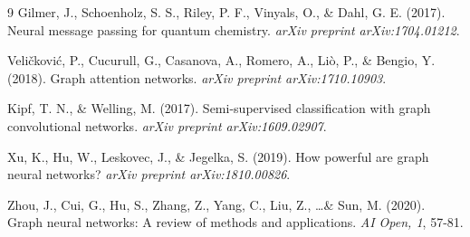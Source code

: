 \documentclass[12pt,a4paper]{article}
\begin{document}
\begin{thebibliography}{9}
Gilmer, J., Schoenholz, S. S., Riley, P. F., Vinyals, O., \& Dahl, G. E. (2017). Neural message passing for quantum chemistry. \textit{arXiv preprint arXiv:1704.01212}.

Veličković, P., Cucurull, G., Casanova, A., Romero, A., Liò, P., \& Bengio, Y. (2018). Graph attention networks. \textit{arXiv preprint arXiv:1710.10903}.

Kipf, T. N., \& Welling, M. (2017). Semi-supervised classification with graph convolutional networks. \textit{arXiv preprint arXiv:1609.02907}.

Xu, K., Hu, W., Leskovec, J., \& Jegelka, S. (2019). How powerful are graph neural networks? \textit{arXiv preprint arXiv:1810.00826}.

Zhou, J., Cui, G., Hu, S., Zhang, Z., Yang, C., Liu, Z., \ldots \& Sun, M. (2020). Graph neural networks: A review of methods and applications. \textit{AI Open, 1}, 57-81.
\end{thebibliography}

\appendix
\end{document}
